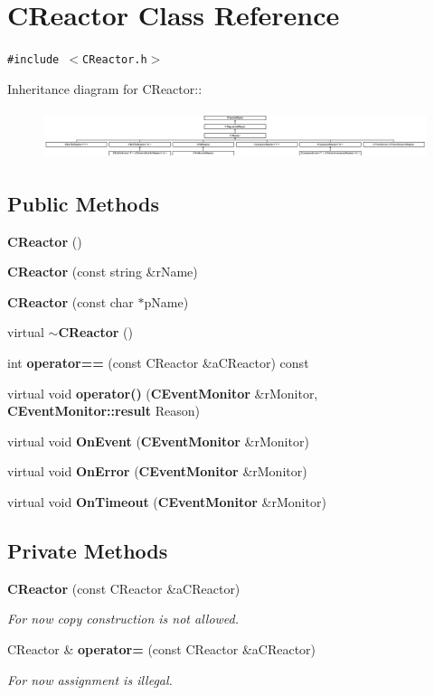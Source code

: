 \section{CReactor  Class Reference}
\label{classCReactor}
{\tt \#include $<$CReactor.h$>$}

Inheritance diagram for CReactor::\begin{figure}[H]
\begin{center}
\leavevmode
\includegraphics[height=1.44033cm]{classCReactor}
\end{center}
\end{figure}
\subsection*{Public Methods}
\begin{CompactItemize}
\item 
{\bf CReactor} ()
\item 
{\bf CReactor} (const string \&r\-Name)
\item 
{\bf CReactor} (const char $\ast$p\-Name)
\item 
virtual {\bf $\sim$CReactor} ()
\item 
int {\bf operator==} (const CReactor \&a\-CReactor) const
\item 
virtual void {\bf operator()} ({\bf CEvent\-Monitor} \&r\-Monitor, {\bf CEvent\-Monitor::result} Reason)
\item 
virtual void {\bf On\-Event} ({\bf CEvent\-Monitor} \&r\-Monitor)
\item 
virtual void {\bf On\-Error} ({\bf CEvent\-Monitor} \&r\-Monitor)
\item 
virtual void {\bf On\-Timeout} ({\bf CEvent\-Monitor} \&r\-Monitor)
\end{CompactItemize}
\subsection*{Private Methods}
\begin{CompactItemize}
\item 
{\bf CReactor} (const CReactor \&a\-CReactor)
\begin{CompactList}\small\item\em For now copy construction is not allowed.\item\end{CompactList}\item 
CReactor \& {\bf operator=} (const CReactor \&a\-CReactor)
\begin{CompactList}\small\item\em For now assignment is illegal.\item\end{CompactList}\end{CompactItemize}


